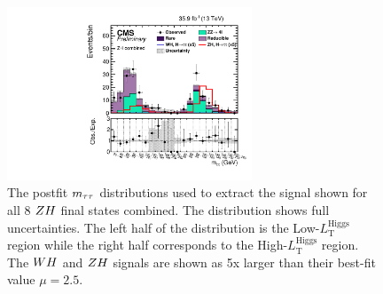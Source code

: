 

\begin{figure}[h!]
 \begin{center}
  \includegraphics[width=0.65\textwidth]{higgs_to_taus_vh/plots/zh/zh_postfit.pdf}
 \end{center}
 \caption{The postfit $m_{\tau\tau}$ distributions used to extract the signal shown
  for all 8 $ZH$ final states combined.
  The distribution shows full uncertainties.
  The left half of the distribution is the Low-$L_{\text{T}}^{\textrm{Higgs}}$ region
  while the right half corresponds to the High-$L_{\text{T}}^{\textrm{Higgs}}$ region.
  The $WH$ and $ZH$ signals are shown as 5x larger than their best-fit
  value $\mu = 2.5$.
 }
 \label{fig:zh_results_svFitAll}
\end{figure}



